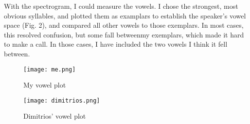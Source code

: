 \documentclass[doc,12pt]{apa6}
\begin{document}
With the spectrogram, I could measure the vowels. I chose the strongest, most
obvious syllables, and plotted them as examplars to establish the speaker's
vowel space (Fig. 2), and compared all other vowels to those exemplars. In most
cases, this resolved confusion, but some fall betweenmy exemplars, which made
it hard to make a call. In those cases, I have included the two vowels I think
it fell between.

\begin{exe}
	\ex {}
\end{exe}

\begin{figure}
	\texttt{[image: me.png]}
	\caption{My vowel plot}
\end{figure}

\begin{figure}
	\texttt{[image: dimitrios.png]}
	\caption{Dimitrios' vowel plot}
\end{figure}
\end{document}

